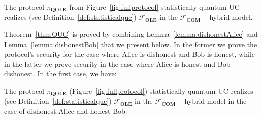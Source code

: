 \begin{theorem}

The protocol $\mathcal{\pi}_{\textbf{QOLE}}$ from Figure~\ref{fig:fullprotocol} statistically quantum-UC realizes  (see Definition~\ref{def:statisticalquc}) $\mathcal{F}_{\textbf{OLE}}$ in the $\mathcal{F}_{\textbf{COM}}-$hybrid model.
\label{thm:QUC}
\end{theorem}

Theorem~\ref{thm:QUC} is proved by combining Lemma~\ref{lemma:dishonestAlice} and Lemma~\ref{lemma:dishonestBob} that we present below.  In the former we prove the protocol's security for the case where Alice is dishonest and Bob is honest, while in the latter we prove security in the case where Alice is honest and Bob dishonest. 
In the first case, we have:

\begin{lemma}
The protocol $\mathcal{\pi}_{\textbf{QOLE}}$ (Figure~\ref{fig:fullprotocol}) statistically quantum-UC realizes  (see Definition~\ref{def:statisticalquc}) $\mathcal{F}_{\textbf{OLE}}$ in the $\mathcal{F}_{\textbf{COM}}-$hybrid model in the case of dishonest Alice and honest Bob.
\label{lemma:dishonestAlice}
\end{lemma}

